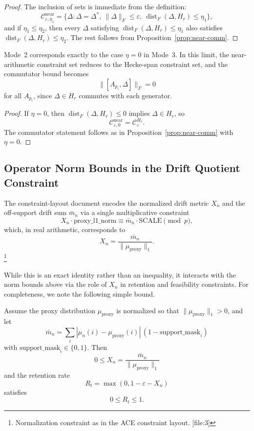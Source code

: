 \documentclass[11pt]{article}
\begin{document}
\begin{proof}
The inclusion of sets is immediate from the definition:
\[
\mathcal{C}^{\mathrm{near}}_{\varepsilon,\eta_1}
  = \{\Delta: \Delta = \Delta^*,\ \|\Delta\|_F\le\varepsilon,\ \operatorname{dist}_F(\Delta,H_r)\le\eta_1\},
\]
and if \(\eta_1\le \eta_2\), then every \(\Delta\) satisfying \(\operatorname{dist}_F(\Delta,H_r)\le\eta_1\) also satisfies \(\operatorname{dist}_F(\Delta,H_r)\le\eta_2\). The rest follows from Proposition~\ref{prop:near-comm}.
\end{proof}

\begin{corollary}\label{cor:mode2-endpoint}
Mode~2 corresponds exactly to the case \(\eta=0\) in Mode~3. In this limit, the near-arithmetic constraint set reduces to the Hecke-span constraint set, and the commutator bound becomes
\[
\|[A_{p_i},\Delta]\|_F = 0
\]
for all \(A_{p_i}\), since \(\Delta\in H_r\) commutes with each generator.
\end{corollary}

\begin{proof}
If \(\eta=0\), then \(\operatorname{dist}_F(\Delta,H_r)\le 0\) implies \(\Delta\in H_r\), so
\[
\mathcal{C}^{\mathrm{near}}_{\varepsilon,0} = \mathcal{C}_\varepsilon^{H_r}.
\]
The commutator statement follows as in Proposition~\ref{prop:near-comm} with \(\eta=0\).
\end{proof}

\subsection{Operator Norm Bounds in the Drift Quotient Constraint}

The constraint-layout document encodes the normalized drift metric \(X_n\) and the off-support drift sum \(\bar m_n\) via a single multiplicative constraint
\[
X_n \cdot \mathrm{proxy\_l1\_norm} \equiv \bar m_n \cdot \mathrm{SCALE} \pmod{p}, 
\]
which, in real arithmetic, corresponds to
\[
X_n = \frac{\bar m_n}{\|\mu_{\mathrm{proxy}}\|_1}.
\]\footnote{Normalization constraint as in the ACE constraint layout. [file:3]}

While this is an exact identity rather than an inequality, it interacts with the norm bounds above via the role of \(X_n\) in retention and feasibility constraints. For completeness, we note the following simple bound.

\begin{lemma}\label{lem:drift-retention}
Assume the proxy distribution \(\mu_{\mathrm{proxy}}\) is normalized so that \(\|\mu_{\mathrm{proxy}}\|_1 > 0\), and let
\[
\bar m_n = \sum_{i} |\mu_n(i) - \mu_{\mathrm{proxy}}(i)|\,(1-\mathrm{support\_mask}_i)
\]
with \(\mathrm{support\_mask}_i\in\{0,1\}\). Then
\[
0 \le X_n = \frac{\bar m_n}{\|\mu_{\mathrm{proxy}}\|_1}
\]
and the retention rate
\[
R_t = \max(0, 1 - \varepsilon - X_n)
\]
satisfies
\[
0 \le R_t \le 1.
\]
\end{lemma}
\end{document}
